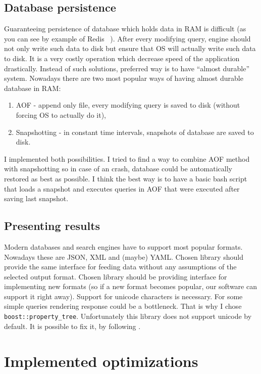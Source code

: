 \documentclass[10pt,a4paper]{article}
\begin{document}
\subsection{Database persistence}
Guaranteeing persistence of database which holds data in RAM is difficult (as you can see by example of Redis ~\cite{REDPE}). After every modifying query, engine should not only write such data to disk but ensure that OS will actually write such data to disk. It is a very costly operation which decrease speed of the application drastically. Instead of such solutions, preferred way is to have “almost durable” system.
Nowadays there are two most popular ways of having almost durable database in RAM:

\begin{enumerate}
\item AOF - append only file, every modifying query is saved to disk (without forcing OS to actually do it),
\item Snapshotting - in constant time intervals, snapshots of database are saved to disk.
\end{enumerate}
I implemented both possibilities. I tried to find a way to combine AOF method with snapshotting so in case of an crash, database could be automatically restored as best as possible. I think the best way is to have a basic bash script that loads a snapshot and executes queries in AOF that were executed after saving last snapshot.

\subsection{Presenting results}
Modern databases and search engines have to support most popular formats. Nowadays these are
JSON, XML and (maybe) YAML. Chosen library should provide the same interface for feeding data without any assumptions of the selected output format. Chosen library should be providing interface for implementing new formats (so if a new format becomes popular, our software can support it right away). Support for unicode characters is necessary. For some simple queries rendering response could be a bottleneck. That is why I chose \verb|boost::property_tree|. 
Unfortunately this library does not support unicode by default. It is possible to fix it, by following \cite{SOANS} .

\section{Implemented optimizations}
\end{document}
